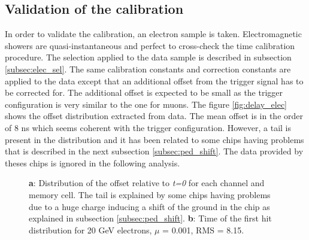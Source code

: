 \documentclass[twoside,a4paper,11pt]{article}
\begin{document}
\subsection{Validation of the calibration}
\label{subsec:validation}

In order to validate the calibration, an electron sample is taken. Electromagnetic showers are quasi-instantaneous and perfect to cross-check the time calibration procedure. The selection applied to the data sample is described in subsection \ref{subsec:elec_sel}. The same calibration constants and correction constants are applied to the data except that an additional offset from the trigger signal has to be corrected for. The additional offset is expected to be small as the trigger configuration is very similar to the one for muons. The figure \ref{fig:delay_elec} shows the offset distribution extracted from data. The mean offset is in the order of 8 ns which seems coherent with the trigger configuration. However, a tail is present in the distribution and it has been related to some chips having problems that is described in the next subsection \ref{subsec:ped_shift}. The data provided by theses chips is ignored in the following analysis.
\begin{figure}[htbp]
	\hfill
	\caption[]{\textbf{a}: Distribution of the offset relative to \textit{t=0} for each channel and memory cell. The tail is explained by some chips having problems due to a huge charge inducing a shift of the ground in the chip as explained in subsection \ref{subsec:ped_shift}. \textbf{b}: Time of the first hit distribution for 20 GeV electrons, $\mu$ = 0.001, RMS = 8.15.}
\end{figure}
\end{document}
